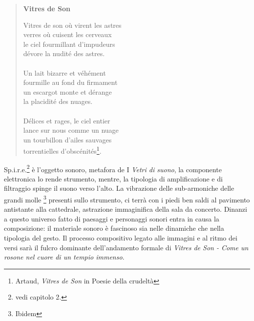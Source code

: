 \begin{quotation}
{\sf \textbf{Vitres de Son}

Vitres de son où virent les astres \\
verres où cuisent les cerveaux \\
le ciel fourmillant d'impudeurs \\
dévore la nudité des astres. \\ \\
Un lait bizarre et véhément \\
fourmille au fond du firmament \\
un escargot monte et dérange \\
la placidité des nuages. \\ \\
Délices et rages, le ciel entier \\
lance sur nous comme un nuage \\
un tourbillon d'ailes sauvages \\
torrentielles d'obscénités\footnote{Artaud, \textit{Vitres de Son} in Poesie della crudeltà}.}
\end{quotation}

Sp.i.r.e.\footnote{vedi capitolo 2.} è l'oggetto sonoro, metafora de I \textit{Vetri di suono}, la componente elettronica lo rende strumento, mentre, la tipologia di amplificazione e di filtraggio spinge il suono verso l'alto. La vibrazione delle sub-armoniche delle grandi molle \footnote{Ibidem} presenti sullo strumento, ci terrà con i piedi ben saldi al pavimento antistante alla cattedrale, astrazione immaginifica della sala da concerto. Dinanzi a questo universo fatto di paesaggi e personaggi sonori entra in causa la composizione: il materiale sonoro è fascinoso sia nelle dinamiche che nella tipologia del gesto. Il processo compositivo legato alle immagini e al ritmo dei versi sarà il fulcro dominante dell'andamento formale di \textit{Vitres de Son - Come un rosone nel cuore di un tempio immenso}.
